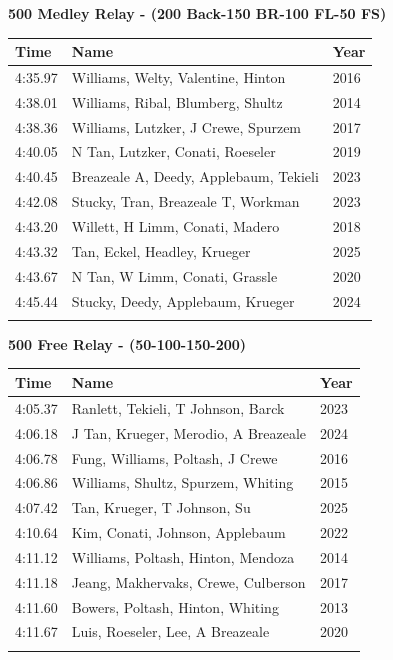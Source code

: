 \noindent\begin{minipage}[t]{0.98\textwidth}
\centering
\textbf{\textcolor{teamprimary}{500 Medley Relay - (200 Back-150 BR-100 FL-50 FS)}}\par
\vspace{0.5em}
\centering
\small
\renewcommand{\arraystretch}{1.0}
\setlength{\tabcolsep}{4pt}
\begin{tabular}{@{}p{4.5cm}p{8.5cm}p{2.5cm}@{}}
\toprule
\textbf{Time} & \textbf{Name} & \textbf{Year} \\
\midrule
4:35.97 & Williams, Welty, Valentine, Hinton & 2016 \\
4:38.01 & Williams, Ribal, Blumberg, Shultz & 2014 \\
4:38.36 & Williams, Lutzker, J Crewe, Spurzem & 2017 \\
4:40.05 & N Tan, Lutzker, Conati, Roeseler & 2019 \\
4:40.45 & Breazeale A, Deedy, Applebaum, Tekieli & 2023 \\
4:42.08 & Stucky, Tran, Breazeale T, Workman & 2023 \\
4:43.20 & Willett, H Limm, Conati, Madero & 2018 \\
4:43.32 & Tan, Eckel, Headley, Krueger & 2025 \\
4:43.67 & N Tan, W Limm, Conati, Grassle & 2020 \\
4:45.44 & Stucky, Deedy, Applebaum, Krueger & 2024 \\
\bottomrule
\vspace{0.5em}
\end{tabular}
\end{minipage}
\vspace{1.2em}
\noindent\begin{minipage}[t]{0.98\textwidth}
\centering
\textbf{\textcolor{teamprimary}{500 Free Relay - (50-100-150-200)}}\par
\vspace{0.5em}
\centering
\small
\renewcommand{\arraystretch}{1.0}
\setlength{\tabcolsep}{4pt}
\begin{tabular}{@{}p{4.5cm}p{8.5cm}p{2.5cm}@{}}
\toprule
\textbf{Time} & \textbf{Name} & \textbf{Year} \\
\midrule
4:05.37 & Ranlett, Tekieli, T Johnson, Barck & 2023 \\
4:06.18 & J Tan, Krueger, Merodio, A Breazeale & 2024 \\
4:06.78 & Fung, Williams, Poltash, J Crewe & 2016 \\
4:06.86 & Williams, Shultz, Spurzem, Whiting & 2015 \\
4:07.42 & Tan, Krueger, T Johnson, Su & 2025 \\
4:10.64 & Kim, Conati, Johnson, Applebaum & 2022 \\
4:11.12 & Williams, Poltash, Hinton, Mendoza & 2014 \\
4:11.18 & Jeang, Makhervaks, Crewe, Culberson & 2017 \\
4:11.60 & Bowers, Poltash, Hinton, Whiting & 2013 \\
4:11.67 & Luis, Roeseler, Lee, A Breazeale & 2020 \\
\bottomrule
\vspace{0.5em}
\end{tabular}
\end{minipage}